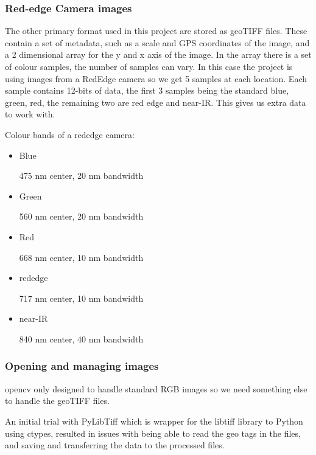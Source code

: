 \subsubsection{Red-edge Camera images}
    
The other primary format used in this project are stored as geoTIFF files. These contain a set of metadata, such as a scale and GPS coordinates of the image, and a 2 dimensional array for the y and x axis of the image. In the array there is a set of colour samples, the number of samples can vary. In this case the project is using images from a RedEdge camera so we get 5 samples at each location. Each sample contains 12-bits of data, the first 3 samples being the standard blue, green, red, the remaining two are red edge and near-IR. This gives us extra data to work with.


Colour bands of a rededge camera:

\begin{itemize}
    \item Blue 
    
    475 nm center, 20 nm bandwidth
    
    \item Green 
    
    560 nm center, 20 nm bandwidth
    
    \item Red 
    
    668 nm center, 10 nm bandwidth
    
    \item rededge
    
    717 nm center, 10 nm bandwidth
    
    \item near-IR
    
    840 nm center, 40 nm bandwidth\cite{rededge}
\end{itemize}

\subsubsection{Opening and managing images}

opencv only designed to handle standard RGB images so we need something else to handle the geoTIFF files.

An initial trial with PyLibTiff \cite{pylibtiff} which is wrapper for the libtiff library to Python using ctypes, resulted in issues with being able to read the geo tags in the files, and saving and transferring the data to the processed files.

